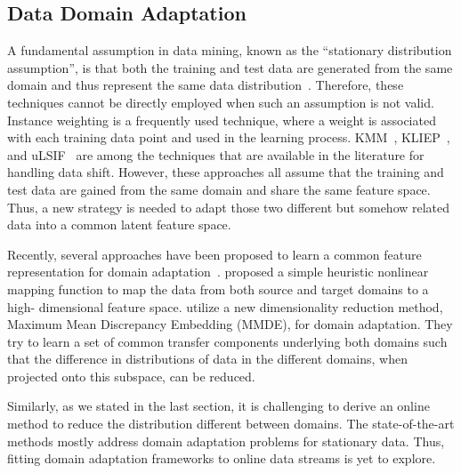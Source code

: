 \subsection{Data Domain Adaptation}

A fundamental assumption in data mining, known as the ``stationary distribution assumption'', is that both the training and test data are generated from the same domain and thus represent the same data distribution~\cite{conf/icml/Zadrozny04}. Therefore, these techniques cannot be directly employed when such an assumption is not valid. Instance weighting is a frequently used technique, where a weight is associated with each training data point and used in the learning process. KMM~\cite{conf/nips/HuangSGBS06}, KLIEP~\cite{artical:sugiyama2008direct}, and uLSIF~\cite{journals/jmlr/KanamoriHS09} are among the techniques that are available in the literature for handling data shift. However, these approaches all assume that the training and test data are gained from the same domain and share the same feature space. Thus, a new strategy is needed to adapt those two different but somehow related data into a common latent feature space.

Recently, several approaches have been proposed to learn a common feature representation for domain adaptation~\cite{journals/ml/Ben-DavidBCKPV10,journals/tkde/PanY10,journals/jbd/DayK17}. \cite{conf/acl/Daume07} proposed a simple heuristic nonlinear mapping function to map the data from both source and target domains to a high- dimensional feature space. \cite{conf/aaai/PanKY08,journals/tnn/PanTKY11} utilize a new dimensionality reduction method, Maximum Mean Discrepancy Embedding (MMDE), for domain adaptation. They try to learn a set of common transfer components underlying both domains such that the difference in distributions of data in the different domains, when projected onto this subspace, can be reduced.

Similarly, as we stated in the last section, it is challenging to derive an online method to reduce the distribution different between domains. The state-of-the-art methods mostly address domain adaptation problems for stationary data. Thus, fitting domain adaptation frameworks to online data streams is yet to explore.
